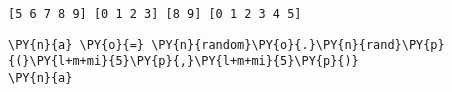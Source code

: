 \par\vspace{1\smallerfontscale}%
    \begin{addmargin}[\cellleftmargin]{0em}%
    {\smaller%
    \vspace{-1\smallerfontscale}%
    
    \begin{Verbatim}[commandchars=\\\{\}]
[5 6 7 8 9] [0 1 2 3] [8 9] [0 1 2 3 4 5]
    \end{Verbatim}
}%
    \end{addmargin}%

{\par%
\vspace{-1\baselineskip}%
}%
\begin{notebookcell}[67]%
\begin{addmargin}[\cellleftmargin]{0em}%
{\smaller%
\par%
%
\vspace{-1\smallerfontscale}%
\begin{Verbatim}[commandchars=\\\{\}]
\PY{n}{a} \PY{o}{=} \PY{n}{random}\PY{o}{.}\PY{n}{rand}\PY{p}{(}\PY{l+m+mi}{5}\PY{p}{,}\PY{l+m+mi}{5}\PY{p}{)}
\PY{n}{a}
\end{Verbatim}
%
\par%
\vspace{-1\smallerfontscale}}%
\end{addmargin}
\end{notebookcell}

\par\vspace{1\smallerfontscale}%
    
